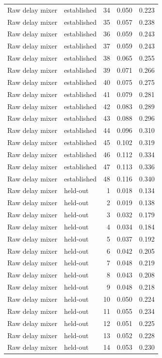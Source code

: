 \begin{tabular}{llrrr}
Raw delay mixer & established & 34 & 0.050 & 0.223 \\
Raw delay mixer & established & 35 & 0.057 & 0.238 \\
Raw delay mixer & established & 36 & 0.059 & 0.243 \\
Raw delay mixer & established & 37 & 0.059 & 0.243 \\
Raw delay mixer & established & 38 & 0.065 & 0.255 \\
Raw delay mixer & established & 39 & 0.071 & 0.266 \\
Raw delay mixer & established & 40 & 0.075 & 0.275 \\
Raw delay mixer & established & 41 & 0.079 & 0.281 \\
Raw delay mixer & established & 42 & 0.083 & 0.289 \\
Raw delay mixer & established & 43 & 0.088 & 0.296 \\
Raw delay mixer & established & 44 & 0.096 & 0.310 \\
Raw delay mixer & established & 45 & 0.102 & 0.319 \\
Raw delay mixer & established & 46 & 0.112 & 0.334 \\
Raw delay mixer & established & 47 & 0.113 & 0.336 \\
Raw delay mixer & established & 48 & 0.116 & 0.340 \\
Raw delay mixer & held-out & 1 & 0.018 & 0.134 \\
Raw delay mixer & held-out & 2 & 0.019 & 0.138 \\
Raw delay mixer & held-out & 3 & 0.032 & 0.179 \\
Raw delay mixer & held-out & 4 & 0.034 & 0.184 \\
Raw delay mixer & held-out & 5 & 0.037 & 0.192 \\
Raw delay mixer & held-out & 6 & 0.042 & 0.205 \\
Raw delay mixer & held-out & 7 & 0.048 & 0.219 \\
Raw delay mixer & held-out & 8 & 0.043 & 0.208 \\
Raw delay mixer & held-out & 9 & 0.048 & 0.218 \\
Raw delay mixer & held-out & 10 & 0.050 & 0.224 \\
Raw delay mixer & held-out & 11 & 0.055 & 0.234 \\
Raw delay mixer & held-out & 12 & 0.051 & 0.225 \\
Raw delay mixer & held-out & 13 & 0.052 & 0.228 \\
Raw delay mixer & held-out & 14 & 0.053 & 0.230 \\

\end{tabular}
